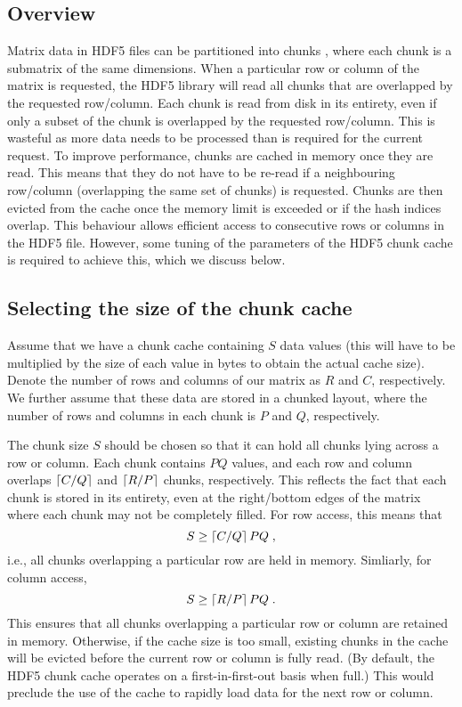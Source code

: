 \documentclass{article}
\begin{document}
\subsection{Overview}
Matrix data in HDF5 files can be partitioned into chunks \cite{hdf5chunk}, where each chunk is a submatrix of the same dimensions.
When a particular row or column of the matrix is requested, the HDF5 library will read all chunks that are overlapped by the requested row/column.
Each chunk is read from disk in its entirety, even if only a subset of the chunk is overlapped by the requested row/column.
This is wasteful as more data needs to be processed than is required for the current request.
To improve performance, chunks are cached in memory once they are read.
This means that they do not have to be re-read if a neighbouring row/column (overlapping the same set of chunks) is requested.
Chunks are then evicted from the cache once the memory limit is exceeded or if the hash indices overlap.
This behaviour allows efficient access to consecutive rows or columns in the HDF5 file.
However, some tuning of the parameters of the HDF5 chunk cache is required to achieve this, which we discuss below.

\subsection{Selecting the size of the chunk cache}
Assume that we have a chunk cache containing $S$ data values (this will have to be multiplied by the size of each value in bytes to obtain the actual cache size).
Denote the number of rows and columns of our matrix as $R$ and $C$, respectively. 
We further assume that these data are stored in a chunked layout, where the number of rows and columns in each chunk is $P$ and $Q$, respectively.

The chunk size $S$ should be chosen so that it can hold all chunks lying across a row or column.
Each chunk contains $PQ$ values, and each row and column overlaps $\left \lceil C/Q \right \rceil$ and $\left \lceil R/P \right \rceil$ chunks, respectively.
This reflects the fact that each chunk is stored in its entirety, even at the right/bottom edges of the matrix where each chunk may not be completely filled.
For row access, this means that 
\begin{equation}
S \ge \left \lceil C/Q \right \rceil PQ \;, 
\end{equation}
i.e., all chunks overlapping a particular row are held in memory. Simliarly, for column access, 
\begin{equation}
S \ge \left \lceil R/P \right \rceil PQ \;.
\end{equation}
This ensures that all chunks overlapping a particular row or column are retained in memory.
Otherwise, if the cache size is too small, existing chunks in the cache will be evicted before the current row or column is fully read.
(By default, the HDF5 chunk cache operates on a first-in-first-out basis when full.)
This would preclude the use of the cache to rapidly load data for the next row or column.
\end{document}
